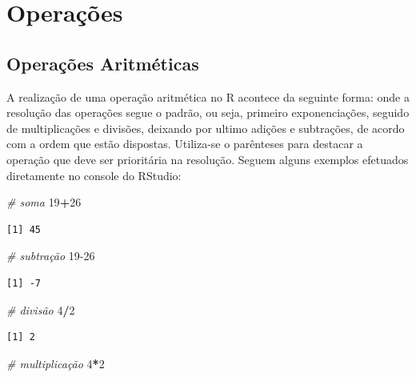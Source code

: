 \documentclass[12pt,brazil,oneside]{book}
\newenvironment{Shaded}{\begin{snugshade}}{\end{snugshade}}
\newcommand{\CommentTok}[1]{\textcolor[rgb]{0.56,0.35,0.01}{\textit{#1}}}
\newcommand{\DecValTok}[1]{\textcolor[rgb]{0.00,0.00,0.81}{#1}}
\newcommand{\OperatorTok}[1]{\textcolor[rgb]{0.81,0.36,0.00}{\textbf{#1}}}
\begin{document}
\hypertarget{operacoes}{%
\section{Operações}\label{operacoes}}

\hypertarget{operacoes-aritmeticas}{%
\subsection{Operações Aritméticas}\label{operacoes-aritmeticas}}

A realização de uma operação aritmética no R acontece da seguinte forma: onde a resolução das operações segue o padrão, ou seja, primeiro exponenciações, seguido de multiplicações e divisões, deixando por ultimo adições e subtrações, de acordo com a ordem que estão dispostas. Utiliza-se o parênteses para destacar a operação que deve ser prioritária na resolução. Seguem alguns exemplos efetuados diretamente no console do RStudio:

\begin{Shaded}
\begin{Highlighting}[]
\CommentTok{# soma}
\DecValTok{19}\OperatorTok{+}\DecValTok{26}
\end{Highlighting}
\end{Shaded}

\begin{verbatim}
[1] 45
\end{verbatim}

\begin{Shaded}
\begin{Highlighting}[]
\CommentTok{# subtração}
\DecValTok{19-26}
\end{Highlighting}
\end{Shaded}

\begin{verbatim}
[1] -7
\end{verbatim}

\begin{Shaded}
\begin{Highlighting}[]
\CommentTok{# divisão}
\DecValTok{4}\OperatorTok{/}\DecValTok{2}
\end{Highlighting}
\end{Shaded}

\begin{verbatim}
[1] 2
\end{verbatim}

\begin{Shaded}
\begin{Highlighting}[]
\CommentTok{# multiplicação }
\DecValTok{4}\OperatorTok{*}\DecValTok{2}
\end{Highlighting}
\end{Shaded}
\end{document}
